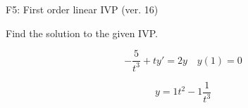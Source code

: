 \begin{exercise}
  \begin{exerciseTitle}F5: First order linear IVP (ver. 16)\end{exerciseTitle}
  \begin{exerciseStatement}
    
Find the solution to the given IVP.

    
\[-\frac{5}{t^{3}} +ty'= 2 y \hspace{1em} y( 1 ) = 0\]

  \end{exerciseStatement}
  \begin{exerciseAnswer}
    
\[y= 1 t^ 2 -1 \frac{1}{t^{3}}\]

  \end{exerciseAnswer}
\end{exercise}